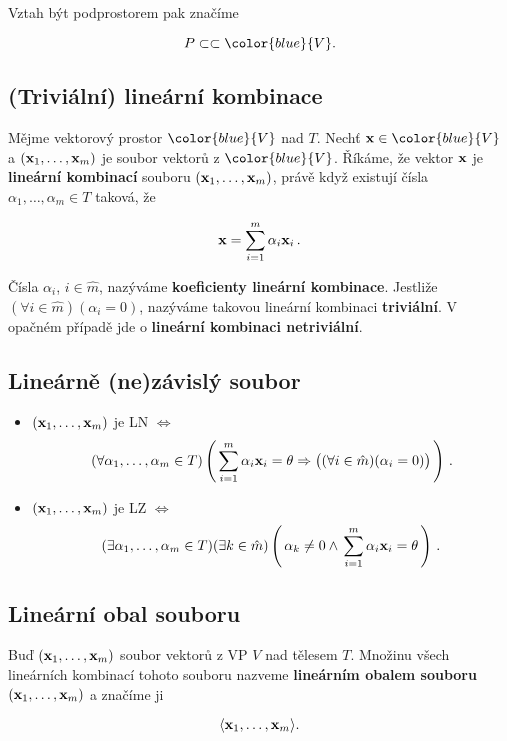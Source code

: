 Vztah být podprostorem pak značíme

\[ P\subset \subset \color{blue}{V}. \]

\subsection*{(Triviální) lineární kombinace}

Mějme vektorový prostor $\color{blue}{V}$ nad $T$. Nechť $\vx\in
    \color{blue}{V}$ a $(\mathbf{x}_{1},\dots,\mathbf{x}_{m})$ je soubor vektorů z
$\color{blue}{V}$. Říkáme, že vektor $\mathbf{x}$ je \textbf{lineární kombinací}
souboru $(\mathbf{x}_{1},\dots,\mathbf{x}_{m})$, právě když existují čísla
$\alpha_{1},\dots,\alpha_{m}\in T$ taková, že

\[ \mathbf{x}=\sum_{i=1}^{m}\alpha_{i}\mathbf{x}_{i}\,. \]

Čísla $\alpha_{i}$, $i\in\hat{m}$, nazýváme \textbf{koeficienty lineární kombinace}.
Jestliže $(\forall i\in\hat{m})(\alpha_{i}=0)$, nazýváme takovou lineární kombinaci \textbf{triviální}.
V opačném případě jde o \textbf{lineární kombinaci netriviální}.

\subsection*{Lineárně (ne)závislý soubor}

\begin{itemize}
    \item $(\mathbf{x}_{1},\dots,\mathbf{x}_{m})$ je LN $\Leftrightarrow$
          \[ (\forall \alpha_{1},\dots,\alpha_{m}\in T)\left(\,\sum_{i=1}^{m}\alpha_{i}\mathbf{x}_{i}=\theta \Rightarrow \big((\forall i\in\hat{m})(\alpha_{i}=0)\big)\,\right)\,. \]
    \item $(\mathbf{x}_{1},\dots,\mathbf{x}_{m})$ je LZ $\Leftrightarrow$
          \[ (\exists \alpha_{1},\dots,\alpha_{m}\in T) (\exists k\in\hat{m})
              \left(\,\alpha_{k}\neq0 \wedge \,\sum_{i=1}^{m}\alpha_{i}\mathbf{x}_{i}=\theta\,\right)\,.
          \]
\end{itemize}

\subsection*{Lineární obal souboru}

Buď $(\mathbf{x}_{1},\dots,\mathbf{x}_{m})$ soubor vektorů z VP $V$ nad tělesem $T$. Množinu
všech lineárních kombinací tohoto souboru nazveme \textbf{lineárním obalem
    souboru} $(\mathbf{x}_{1},\dots,\mathbf{x}_{m})$ a značíme ji

\[ \langle  \mathbf{x}_{1},\dots,\mathbf{x}_{m}  \rangle . \]

